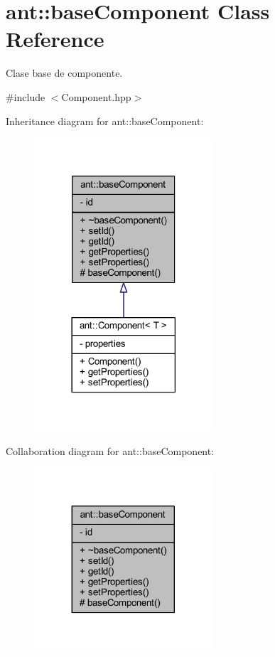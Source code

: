 \hypertarget{classant_1_1base_component}{\section{ant\+:\+:base\+Component Class Reference}
\label{classant_1_1base_component}
}


Clase base de componente.  




{\ttfamily \#include $<$Component.\+hpp$>$}



Inheritance diagram for ant\+:\+:base\+Component\+:
\nopagebreak
\begin{figure}[H]
\begin{center}
\leavevmode
\includegraphics[width=189pt]{d2/ddb/classant_1_1base_component__inherit__graph}
\end{center}
\end{figure}


Collaboration diagram for ant\+:\+:base\+Component\+:
\nopagebreak
\begin{figure}[H]
\begin{center}
\leavevmode
\includegraphics[width=188pt]{d4/d8a/classant_1_1base_component__coll__graph}
\end{center}
\end{figure}
